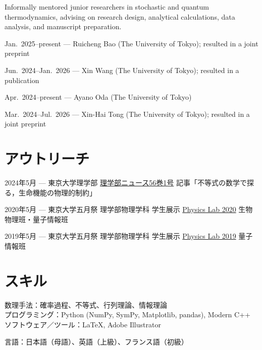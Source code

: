 \documentclass[11pt,a4paper,uplatex,nomag,dvipdfmx]{jsarticle}
\newcommand{\je}[2]{#1}
\newcommand{\je}[2]{#2}
\begin{document}
Informally mentored junior researchers in stochastic and quantum thermodynamics, advising on research design, analytical calculations, data analysis, and manuscript preparation.

Jan.~2025--present --- Ruicheng Bao (The University of Tokyo); resulted in a joint preprint

Jun.~2024--Jan.~2026 --- Xin Wang (The University of Tokyo); resulted in a publication

Apr.~2024--present --- Ayano Oda (The University of Tokyo)

Mar.~2024--Jul.~2026 --- Xin-Hai Tong (The University of Tokyo); resulted in a joint preprint



\fi



\section{\je{アウトリーチ}{Outreach \& Popular Science}}


\je{2024年5月}{May 2024} --- 
\je{東京大学理学部 \href{https://www.s.u-tokyo.ac.jp/ja/story/newsletter/page/10353}{理学部ニュース56巻1号} 記事「不等式の数学で探る，生命機能の物理的制約」}{Article ``Physical constraints on biological functions, explored by the mathematics of inequalities'' (in Japanese), \href{https://www.s.u-tokyo.ac.jp/ja/story/newsletter/page/10353}{Rigakubu News Vol.~56, No.~1}, School of Science, The University of Tokyo}


\je{2020年5月}{May 2020} --- 
\je{東京大学五月祭 理学部物理学科 学生展示 \href{https://event.phys.s.u-tokyo.ac.jp/physlab2020/index.html}{Physics Lab 2020} 生物物理班・量子情報班}
{Biophysics Group \& Quantum Information Group in \href{https://event.phys.s.u-tokyo.ac.jp/physlab2020/index.html}{Physics Lab 2020},
Students' presentation at the school festival of The University of Tokyo} 


\je{2019年5月}{May 2019} --- \je{東京大学五月祭 理学部物理学科 学生展示 \href{https://event.phys.s.u-tokyo.ac.jp/physlab2019/}{Physics Lab 2019} 量子情報班}
{Quantum Information Group in \href{https://event.phys.s.u-tokyo.ac.jp/physlab2019/}{Physics Lab 2019},
Students' presentation at the school festival of The University of Tokyo} 



\section{\je{スキル}{Skills}}
\je
{数理手法：確率過程、不等式、行列理論、情報理論}
{Analytical methods: Stochastic processes, Inequalities, Matrix theory, Information theory}\\
\je{プログラミング：}{Programming: }Python (NumPy, SymPy, Matplotlib, pandas), Modern C++\\
\je{ソフトウェア／ツール：}{Software \& Tools: }\LaTeX, Adobe Illustrator

\je{言語：}{Languages: }\je{日本語（母語）、英語（上級）、フランス語（初級）}{Japanese (native), English (fluent), French (basic)}
\end{document}
